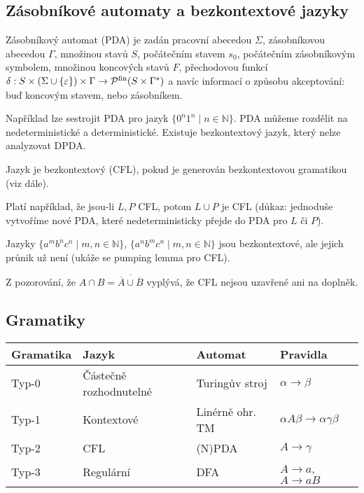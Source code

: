 \subsection{Zásobníkové automaty a bezkontextové jazyky}

\begin{definition}
    Zásobníkový automat (PDA) je zadán
    pracovní abecedou $\Sigma$,
    zásobníkovou abecedou $\Gamma$,
    množinou stavů $S$,
    počátečním stavem $s_0$,
    počátečním zásobníkovým symbolem,
    množinou koncových stavů $F$,
    přechodovou funkcí
    $\delta : S \times (\Sigma \cup \{ \varepsilon \}) \times \Gamma \to
    \mathcal{P}^{\text{fin}}(S \times \Gamma^*)$
    a navíc informací o způsobu akceptování: buď koncovým stavem, nebo
    zásobníkem.
\end{definition}

Například lze sestrojit PDA pro jazyk
$\{ 0^n 1^n \mid n \in \mathbb{N} \}$.
PDA můžeme rozdělit na nedeterministické a deterministické. Existuje
bezkontextový jazyk, který nelze analyzovat DPDA.

\begin{definition}
    Jazyk je bezkontextový (CFL), pokud je generován bezkontextovou
    gramatikou (viz dále).
\end{definition}

Platí například, že jsou-li $L, P$ CFL, potom $L \cup P$ je CFL (důkaz:
jednoduše vytvoříme nové PDA, které nedeterministicky přejde do PDA pro
$L$ či $P$).

\begin{example}
    Jazyky
    $\{ a^m b^n c^n \mid m, n \in \mathbb{N} \}$,
    $\{ a^n b^m c^n \mid m, n \in \mathbb{N} \}$
    jsou bezkontextové, ale
    jejich průnik už není (ukáže se pumping lemma pro CFL).

    Z pozorování, že
    $A \cap B = \overline{\overline{A} \cup \overline{B}}$
    vyplývá, že CFL nejsou uzavřené ani na doplněk.
\end{example}

\pagebreak
\subsection{Gramatiky}


\begin{longtable}[]{llll}
\toprule
Gramatika & Jazyk & Automat & Pravidla \tabularnewline
\midrule
\endhead
Typ-0 & Částečně rozhodnutelné & Turingův stroj & $\alpha \rightarrow \beta$ \tabularnewline
Typ-1 & Kontextové & Linérně ohr. TM & $\alpha A \beta \rightarrow \alpha \gamma \beta$ \tabularnewline
Typ-2 & CFL & (N)PDA &	$ A\rightarrow \gamma$ \tabularnewline
Typ-3 & Regulární & DFA & $A \rightarrow a$, $A \rightarrow aB$ \tabularnewline
\bottomrule
\end{longtable}


